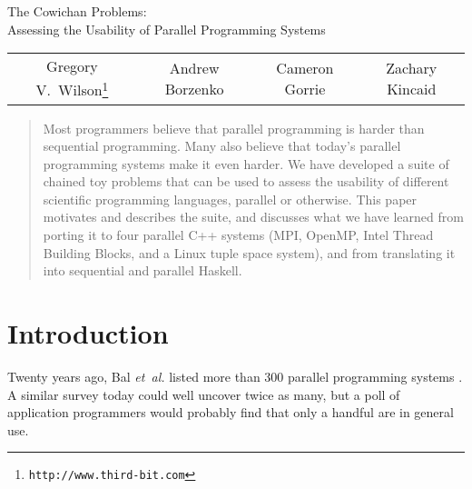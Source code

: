 


\begin{Large}\begin{center}
The Cowichan Problems: \\
Assessing the Usability of Parallel Programming Systems
\end{center}\end{Large}

\vspace{\baselineskip}

\begin{center}
\begin{tabular}{cccc}
Gregory V.~Wilson\footnote{\verb`http://www.third-bit.com`}
&
Andrew Borzenko
&
Cameron Gorrie
&
Zachary Kincaid
\end{tabular}
\end{center}

\vspace{\baselineskip}

\begin{abstract}
Most programmers believe that parallel programming is harder than sequential programming.
Many also believe that today's parallel programming systems make it even harder.
We have developed a suite of chained toy problems that can be used to assess
the usability of different scientific programming languages, parallel or otherwise.
This paper motivates and describes the suite,
and discusses what we have learned from porting it to four parallel C++ systems
(MPI, OpenMP, Intel Thread Building Blocks, and a Linux tuple space system),
and from translating it into sequential and parallel Haskell.
\end{abstract}

\section{Introduction\label{s:intro}}

Twenty years ago,
Bal {\em{et~al.}\/} listed more than 300 parallel programming systems \cite{b:par-lang-survey}.
A similar survey today could well uncover twice as many,
but a poll of application programmers would probably find that
only a handful are in general use.

